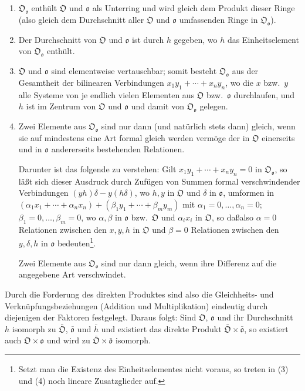 \documentclass[10pt,a4paper]{article}
\theoremstyle{plain}
\theoremstyle{definition}
\theoremstyle{remark}
\newcommand{\ido}{\mathfrak{o}}
\newcommand{\cO}{\mathfrak{O}}
\begin{document}
\begin{enumerate}
\item $\cO_{\ido}$ enth\"ult $\cO$ und $\ido$ als Unterring und wird gleich dem Produkt dieser Ringe (also gleich dem Durchschnitt aller $\cO$ und $\ido$ umfassenden Ringe in $\cO_{\ido}$).

\item Der Durchschnitt von $\cO$ und $\ido$ ist durch $h$ gegeben, wo $h$ das Einheitselement von $\cO_{\ido}$ enth\"ult.

\item $\cO$ und $\ido$ sind elementweise vertauschbar; somit besteht $\cO_{\ido}$ aus der Gesamtheit der bilinearen Verbindungen $x_1 y_1 + \cdots + x_n y_n$, wo die $x$ bzw.\ $y$ alle Systeme von je endlich vielen Elementen aus $\cO$ bzw.\ $\ido$ durchlaufen, und $h$ ist im Zentrum von $\cO$ und $\ido$ und damit von $\cO_{\ido}$ gelegen.

\item Zwei Elemente aus $\cO_{\ido}$ sind nur dann (und nat\"urlich stets dann) gleich, wenn sie auf mindestens eine Art formal gleich werden verm\"oge der in $\cO$ einerseits und in $\ido$ andererseits bestehenden Relationen.

Darunter ist das folgende zu verstehen: Gilt $x_1 y_1 + \cdots + x_n y_n = 0$ in $\cO_{\ido}$, so l\"a\ss t sich dieser Ausdruck durch Zuf\"ugen von Summen formal verschwindender Verbindungen $(y h)\delta - y(h\delta)$, wo $h,y$ in $\cO$ und $\delta$ in $\ido$, umformen in $(\alpha_1 x_1 + \cdots + \alpha_n x_n) + (\beta_1 y_1 + \cdots + \beta_m y_m)$ mit $\alpha_1 = 0,\ldots,\alpha_n = 0$; $\beta_1 = 0,\ldots,\beta_m = 0$, wo $\alpha,\beta$ in $\ido$ bzw.\ $\cO$ und $\alpha_i x_i$ in $\cO$, so da\ss  also $\alpha = 0$ Relationen zwischen den $x, y, h$ in $\cO$ und $\beta = 0$ Relationen zwischen den $y, \delta, h$ in $\ido$ bedeuten\footnote{Setzt man die Existenz des Einheitselementes nicht voraus, so treten in (3) und (4) noch lineare Zusatzglieder auf.}.

Zwei Elemente aus $\cO_{\ido}$ sind nur dann gleich, wenn ihre Differenz auf die angegebene Art verschwindet.
\end{enumerate}

Durch die Forderung des direkten Produktes sind also die Gleichheits- und Verkn\"upfungsbeziehungen (Addition und Multiplikation) eindeutig durch diejenigen der Faktoren festgelegt. Daraus folgt: Sind $\cO$, $\ido$ und ihr Durchschnitt $h$ isomorph zu $\bar{\cO}$, $\bar{\ido}$ und $\bar{h}$ und existiert das direkte Produkt $\bar{\cO} \times \bar{\ido}$, so existiert auch $\cO \times \ido$ und wird zu $\bar{\cO} \times \bar{\ido}$ isomorph.
\end{document}
